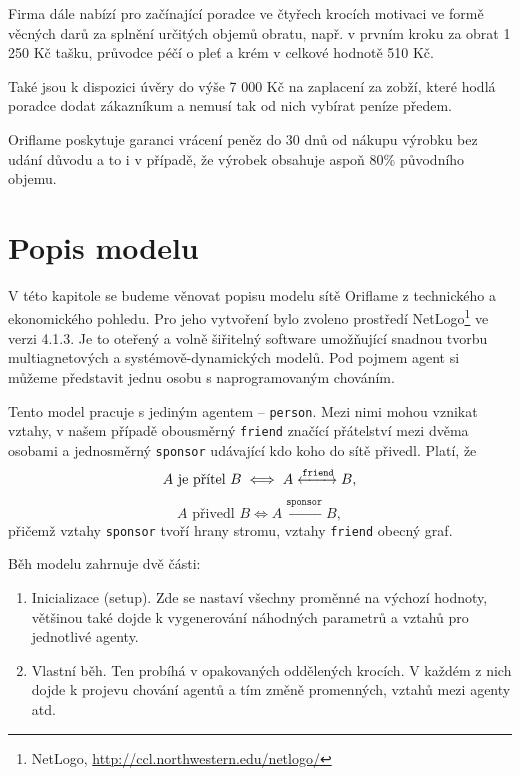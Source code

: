 \documentclass[a4wide,12pt]{report}
\begin{document}
Firma dále nabízí pro začínající poradce ve čtyřech krocích motivaci ve formě věcných darů za splnění určitých objemů obratu, např. v prvním kroku za obrat 1 250 Kč tašku, průvodce péčí o pleť a krém v celkové hodnotě 510 Kč.

Také jsou k dispozici úvěry do výše 7 000 Kč na zaplacení za zobží, které hodlá poradce dodat zákazníkum a nemusí tak od nich vybírat peníze předem.

Oriflame poskytuje garanci vrácení peněz do 30 dnů od nákupu výrobku bez udání důvodu a to i v případě, že výrobek obsahuje aspoň 80\% původního objemu.



\chapter{Popis modelu}
V této kapitole se budeme věnovat popisu modelu sítě Oriflame z technického a ekonomického pohledu. Pro jeho vytvoření bylo zvoleno prostředí NetLogo\footnote{NetLogo, \url{http://ccl.northwestern.edu/netlogo/}} ve verzi 4.1.3. Je to oteřený a volně šiřitelný software umožňující snadnou tvorbu multiagnetových a systémově-dynamických modelů. Pod pojmem agent si můžeme představit jednu osobu s naprogramovaným chováním.

Tento model pracuje s jediným agentem -- \texttt{person}. Mezi nimi mohou vznikat vztahy, v našem případě obousměrný \texttt{friend} značící přátelství mezi dvěma osobami a jednosměrný \texttt{sponsor} udávající kdo koho do sítě přivedl. Platí, že
\[ A \text{ je přítel } B \iff A \xleftrightarrow{\texttt{friend}} B,\]
\[ A \text{ přivedl } B \iff A \xleftarrow{\texttt{sponsor}} B,\]
přičemž vztahy \texttt{sponsor} tvoří hrany stromu, vztahy \texttt{friend} obecný graf.

Běh modelu zahrnuje dvě části:
\begin{enumerate}
\item Inicializace (setup). Zde se nastaví všechny proměnné na výchozí hodnoty, většinou také dojde k vygenerování náhodných parametrů a vztahů pro jednotlivé agenty.
\item Vlastní běh. Ten probíhá v opakovaných oddělených krocích. V každém z nich dojde k projevu chování agentů a tím změně promenných, vztahů mezi agenty atd.
\end{enumerate}
\end{document}
